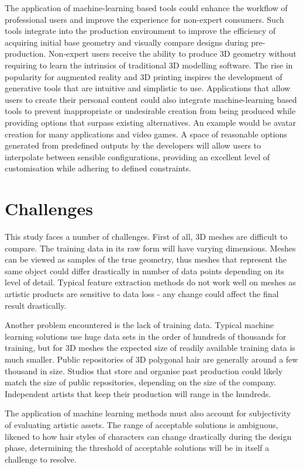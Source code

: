 \documentclass[ %
                    author={Dillon Keith Diep},
                supervisor={Dr. Carl Henrik Ek},
                    degree={MEng},
                     title={Assisted Content Generation for 3D Hair Geometry},
                  subtitle={[INCOMPLETE DRAFT, NOT FOR SUBMISSION]},
                      type={Research},
                      year={2014} ]{dissertation}
\begin{document}
The application of machine-learning based tools could enhance the workflow of professional users and improve the experience for non-expert consumers. Such tools integrate into the production environment to improve the efficiency of acquiring initial base geometry and visually compare designs during pre-production. Non-expert users receive the ability to produce 3D geometry without requiring to learn the intrinsics of traditional 3D modelling software. The rise in popularity for augmented reality and 3D printing inspires the development of generative tools that are intuitive and simplistic to use. Applications that allow users to create their personal content could also integrate machine-learning based tools to prevent inappropriate or undesirable creation from being produced while providing options that surpass existing alternatives. An example would be avatar creation for many applications and video games. A space of reasonable options generated from predefined outputs by the developers will allow users to interpolate between sensible configurations, providing an excellent level of customisation while adhering to defined constraints.

\section{Challenges}
\noindent
This study faces a number of challenges. First of all, 3D meshes are difficult to compare. The training data in its raw form will have varying dimensions. Meshes can be viewed as samples of the true geometry, thus meshes that represent the same object could differ drastically in number of data points depending on its level of detail. Typical feature extraction methods do not work well on meshes as artistic products are sensitive to data loss - any change could affect the final result drastically.

Another problem encountered is the lack of training data. Typical machine learning solutions use huge data sets in the order of hundreds of thousands for training, but for 3D meshes the expected size of readily available training data is much smaller. Public repositories of 3D polygonal hair are generally around a few thousand in size. Studios that store and organise past production could likely match the size of public repositories, depending on the size of the company. Independent artists that keep their production will range in the hundreds.
\cite{tsr}

The application of machine learning methods must also account for subjectivity of evaluating artistic assets. The range of acceptable solutions is ambiguous, likened to how hair styles of characters can change drastically during the design phase, determining the threshold of acceptable solutions will be in itself a challenge to resolve.
\end{document}
